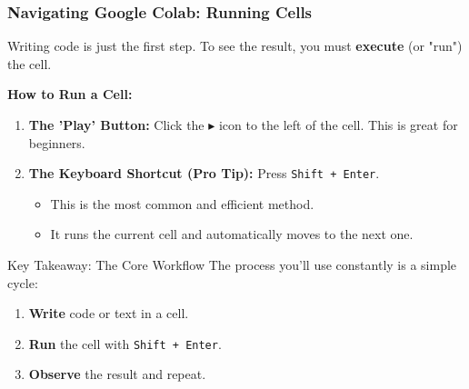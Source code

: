 \documentclass{beamer}
\begin{document}
\begin{frame}[fragile]
    \frametitle{Navigating Google Colab: Running Cells}
    
    Writing code is just the first step. To see the result, you must \textbf{execute} (or "run") the cell.
    
    \vspace{1em}
    
    \textbf{How to Run a Cell:}
    \begin{enumerate}
        \item \textbf{The 'Play' Button:} Click the \(\blacktriangleright\) icon to the left of the cell. This is great for beginners.
        
        \item \textbf{The Keyboard Shortcut (Pro Tip):} Press \texttt{Shift + Enter}.
        \begin{itemize}
            \item This is the most common and efficient method.
            \item It runs the current cell and automatically moves to the next one.
        \end{itemize}
    \end{enumerate}
    
    \vspace{1em}
    
    \begin{block}{Key Takeaway: The Core Workflow}
        The process you'll use constantly is a simple cycle:
        \begin{enumerate}
            \item \textbf{Write} code or text in a cell.
            \item \textbf{Run} the cell with \texttt{Shift + Enter}.
            \item \textbf{Observe} the result and repeat.
        \end{enumerate}
    \end{block}
    
\end{frame}
\end{document}
